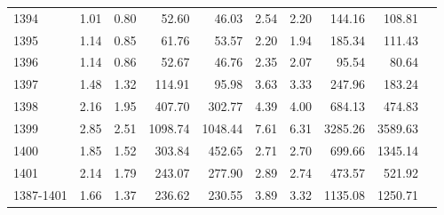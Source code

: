 \documentclass[border=0.2cm]{standalone}
\begin{document}
\begin{tabular}{lrrrrrrrrr}
    1394        & 1.01                                  & 0.80                                 & 52.60                             & 46.03                          & 2.54 & 2.20 & 144.16  & 108.81  \\
    1395        & 1.14                                  & 0.85                                 & 61.76                             & 53.57                          & 2.20 & 1.94 & 185.34  & 111.43  \\
    1396        & 1.14                                  & 0.86                                 & 52.67                             & 46.76                          & 2.35 & 2.07 & 95.54   & 80.64   \\
    1397        & 1.48                                  & 1.32                                 & 114.91                            & 95.98                          & 3.63 & 3.33 & 247.96  & 183.24  \\
    1398        & 2.16                                  & 1.95                                 & 407.70                            & 302.77                         & 4.39 & 4.00 & 684.13  & 474.83  \\
    1399        & 2.85                                  & 2.51                                 & 1098.74                           & 1048.44                        & 7.61 & 6.31 & 3285.26 & 3589.63 \\
    1400        & 1.85                                  & 1.52                                 & 303.84                            & 452.65                         & 2.71 & 2.70 & 699.66  & 1345.14 \\
    1401        & 2.14                                  & 1.79                                 & 243.07                            & 277.90                         & 2.89 & 2.74 & 473.57  & 521.92  \\
    \midrule
    1387-1401   & 1.66                                  & 1.37                                 & 236.62                            & 230.55                         & 3.89 & 3.32 & 1135.08 & 1250.71 \\
    \bottomrule
\end{tabular}
\end{document}
